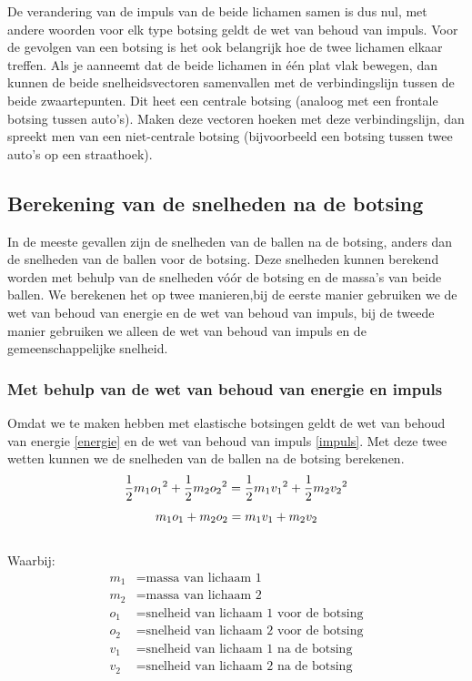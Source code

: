 \documentclass[12pt,a4paper]{article}
\begin{document}
	De verandering van de impuls van de beide lichamen samen is dus nul, met andere woorden voor elk type botsing geldt de wet van behoud van impuls.
Voor de gevolgen van een botsing is het ook belangrijk hoe de twee lichamen elkaar treffen. Als je aanneemt dat de beide lichamen in \'{e}\'{e}n plat vlak bewegen, dan kunnen de beide snelheidsvectoren samenvallen met de verbindingslijn tussen de beide zwaartepunten. Dit heet een centrale botsing (analoog met een frontale botsing tussen auto's). Maken deze vectoren hoeken met deze verbindingslijn, dan spreekt men van een niet-centrale botsing (bijvoorbeeld een botsing tussen twee auto's op een straathoek).

	\subsection{Berekening van de snelheden na de botsing}
	In de meeste gevallen zijn de snelheden van de ballen na de botsing, anders dan de snelheden van de ballen voor de botsing. Deze snelheden kunnen berekend worden met behulp van de snelheden v\'{o}\'{o}r de botsing en de massa's van beide ballen. We berekenen het op twee manieren,bij  de eerste manier gebruiken we de wet van behoud van energie en de wet van behoud van impuls, bij de tweede manier gebruiken we alleen de wet van behoud van impuls en de gemeenschappelijke snelheid.

	\subsubsection{Met behulp van de wet van behoud van energie en impuls}
	Omdat we te maken hebben met elastische botsingen geldt de wet van behoud van energie \eqref{energie} en de wet van behoud van impuls \eqref{impuls}. Met deze twee wetten kunnen we de snelheden van de ballen na de botsing berekenen.
	\begin{equation}
		\label{energie}
		\frac{1}{2} m_1 {o_1}^2 + \frac{1}{2} m_2 {o_2}^2 = \frac{1}{2} m_1{v_1}^2 + \frac{1}{2}m_2 {v_2}^2\\
	\end{equation}
	\begin{equation}
		\label{impuls}
		m_1 o_1 + m_2 o_2 =  m_1 v_1 + m_2 v_2\\
	\end{equation}
	\\Waarbij:
	\begin{equation}
		\begin{aligned}
			m_1 &= \text{massa van lichaam 1}\\
			m_2 &= \text{massa van lichaam 2}\\
			o_1 &= \text{snelheid van lichaam 1 voor de botsing}\\
			o_2 &= \text{snelheid van lichaam 2 voor de botsing}\\
			v_1 &= \text{snelheid van lichaam 1 na de botsing}\\
			v_2 &= \text{snelheid van lichaam 2 na de botsing}\\
		\end{aligned}
	\end{equation}
\end{document}
